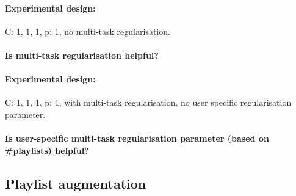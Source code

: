 \paragraph{Experimental design:}
C: 1, 1, 1, p: 1, no multi-task regularisation.

\paragraph{Is multi-task regularisation helpful?}

\begin{table}[!h]
\centering
\caption{Empirical results}
\end{table}

\paragraph{Experimental design:}
C: 1, 1, 1, p: 1, with multi-task regularisation, no user specific regularisation parameter.

\paragraph{Is user-specific multi-task regularisation parameter (based on \#playlists) helpful?}
\begin{table}[!h]
\centering
\caption{Empirical results}
\end{table}



\subsection{Playlist augmentation}

